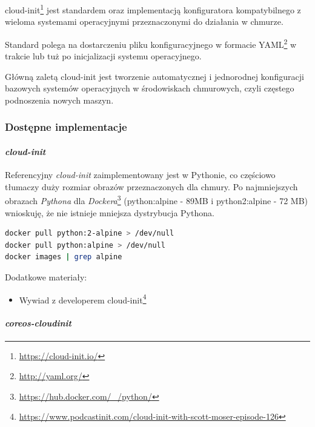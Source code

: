 \documentclass[a4paper,12pt,twoside,openany]{report}
\providecommand{\tightlist}{%
  \setlength{\itemsep}{0pt}\setlength{\parskip}{0pt}}
\DeclareRobustCommand{\href}[2]{#2\footnote{\url{#1}}}
\begin{document}
\href{https://cloud-init.io/}{cloud-init} jest standardem oraz
implementacją konfiguratora kompatybilnego z wieloma systemami
operacyjnymi przeznaczonymi do działania w chmurze.

Standard polega na dostarczeniu pliku konfiguracyjnego w formacie
\href{http://yaml.org/}{YAML} w trakcie lub tuż po inicjalizacji systemu
operacyjnego.

Główną zaletą cloud-init jest tworzenie automatycznej i jednorodnej
konfiguracji bazowych systemów operacyjnych w środowiskach chmurowych,
czyli częstego podnoszenia nowych maszyn.

\hypertarget{dostux119pne-implementacje}{%
\subsubsection{Dostępne
implementacje}\label{dostux119pne-implementacje}}

\hypertarget{cloud-init}{%
\paragraph{\texorpdfstring{\emph{cloud-init}}{cloud-init}}\label{cloud-init}}

Referencyjny \emph{cloud-init} zaimplementowany jest w Pythonie, co
częściowo tłumaczy duży rozmiar obrazów przeznaczonych dla chmury. Po
najmniejszych obrazach
\href{https://hub.docker.com/_/python/}{\emph{Pythona} dla
\emph{Dockera}} (python:alpine - 89MB i python2:alpine - 72 MB)
wnioskuję, że nie istnieje mniejsza dystrybucja Pythona.

\begin{lstlisting}[language=bash]
docker pull python:2-alpine > /dev/null
docker pull python:alpine > /dev/null
docker images | grep alpine
\end{lstlisting}

Dodatkowe materiały:

\begin{itemize}
\tightlist
\item
  \href{https://www.podcastinit.com/cloud-init-with-scott-moser-episode-126}{Wywiad
  z developerem cloud-init}
\end{itemize}

\hypertarget{coreos-cloudinit}{%
\paragraph{\texorpdfstring{\emph{coreos-cloudinit}}{coreos-cloudinit}}\label{coreos-cloudinit}}
\end{document}
